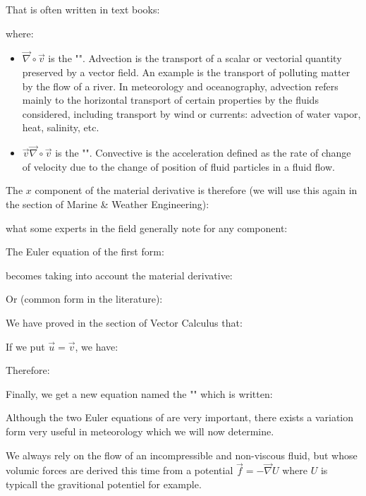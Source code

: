 	That is often written in text books:
	
	where:
	\begin{itemize}
		\item $\vec{\nabla}\circ\vec{v}$ is the "". Advection is the transport of a scalar or vectorial quantity preserved by a vector field. An example is the transport of polluting matter by the flow of a river. In meteorology and oceanography, advection refers mainly to the horizontal transport of certain properties by the fluids considered, including transport by wind or currents: advection of water vapor, heat, salinity, etc.

		\item $\vec{v}\vec{\nabla}\circ\vec{v}$ is the "". Convective is the acceleration defined as the rate of change of velocity due to the change of position of fluid particles in a fluid flow.
	\end{itemize}
	\begin{tcolorbox}[title=Remark,colframe=black,arc=10pt]
	The $x$ component of the material derivative is therefore (we will use this again in the section of Marine \& Weather Engineering):
	
	what some experts in the field generally note for any component:
	
	\end{tcolorbox}
	The Euler equation of the first form:
	
	becomes taking into account the material derivative:
	
	Or (common form in the literature):
	
	We have proved in the section of Vector Calculus that:
	
	If we put $\vec{u}=\vec{v}$, we have:
	
	Therefore:
	
	Finally, we get a new equation named the "" which is written:
	
	Although the two Euler equations of are very important, there exists a variation form very useful in meteorology which we will now determine.

	We always rely on the flow of an incompressible and non-viscous fluid, but whose volumic forces are derived this time from a potential $\vec{f}=-\vec{\nabla}U$ where $U$ is typicall the gravitional potentiel for example.

